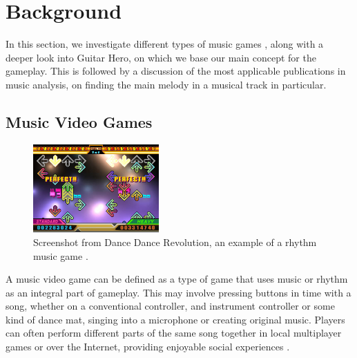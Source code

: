 
\chapter{Background} %

\label{Chapter2} %



In this section, we investigate different types of music games \cite{gametypes}, along with a deeper look into Guitar Hero, on which we base our main concept for the gameplay. This is followed by a discussion of the most applicable publications in music analysis, on finding the main melody in a musical track in particular.

\vspace{20pt}


\section{Music Video Games }

\begin{figure}
  \vspace{-40pt}

  \begin{center}
    \includegraphics[width=0.43\textwidth]{Figures/dancedancerevolution}
  \end{center}
  \caption{Screenshot from Dance Dance Revolution, an example of a rhythm music game \cite{DDR}.}
  \label{fig:DDR}
\end{figure}

A music video game can be defined as a type of game that uses music or rhythm as an integral part of gameplay. This may involve pressing buttons in time with a song, whether on a conventional controller, and instrument controller or some kind of dance mat, singing into a microphone or creating original music. Players can often perform different parts of the same song together in local multiplayer games or over the Internet, providing enjoyable social experiences \cite{mvgdef}.

